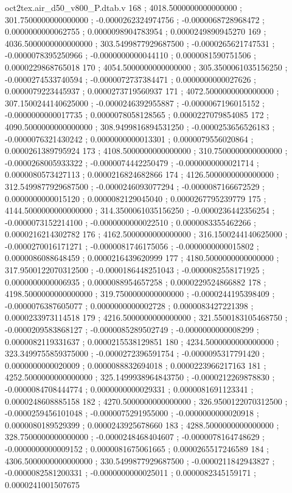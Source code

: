 \begin{filecontents}[overwrite]{oct2tex.air_d50_v800_P.dtab.v}
168 ; 4018.5000000000000000 ; 301.7500000000000000 ; -0.0000262324974756 ; -0.0000068728968472 ; 0.0000000000062755 ; 0.0000098904783954 ; 0.0000249890945270
169 ; 4036.5000000000000000 ; 303.5499877929687500 ; -0.0000265621747531 ; -0.0000078395250966 ; -0.0000000000044110 ; 0.0000081590751506 ; 0.0000229868765018
170 ; 4054.5000000000000000 ; 305.3500061035156250 ; -0.0000274533740594 ; -0.0000072737384471 ; 0.0000000000027626 ; 0.0000079223445937 ; 0.0000273719560937
171 ; 4072.5000000000000000 ; 307.1500244140625000 ; -0.0000246392955887 ; -0.0000067196015152 ; -0.0000000000017735 ; 0.0000078058128565 ; 0.0000227079854085
172 ; 4090.5000000000000000 ; 308.9499816894531250 ; -0.0000253656526183 ; -0.0000076321430242 ; 0.0000000000013301 ; 0.0000079556020864 ; 0.0000261389795924
173 ; 4108.5000000000000000 ; 310.7500000000000000 ; -0.0000268005933322 ; -0.0000074442250479 ; -0.0000000000021714 ; 0.0000080573427113 ; 0.0000216824682866
174 ; 4126.5000000000000000 ; 312.5499877929687500 ; -0.0000246093077294 ; -0.0000087166672529 ; 0.0000000000015120 ; 0.0000082129045040 ; 0.0000267795239779
175 ; 4144.5000000000000000 ; 314.3500061035156250 ; -0.0000236442356254 ; -0.0000073152214100 ; -0.0000000000022510 ; 0.0000083355462266 ; 0.0000216214302782
176 ; 4162.5000000000000000 ; 316.1500244140625000 ; -0.0000270016171271 ; -0.0000081746175056 ; -0.0000000000015802 ; 0.0000086088648459 ; 0.0000216439620999
177 ; 4180.5000000000000000 ; 317.9500122070312500 ; -0.0000186448251043 ; -0.0000082558171925 ; 0.0000000000006935 ; 0.0000088954657258 ; 0.0000229524866882
178 ; 4198.5000000000000000 ; 319.7500000000000000 ; -0.0000244195398409 ; -0.0000076387605077 ; 0.0000000000002728 ; 0.0000083427221398 ; 0.0000233973114518
179 ; 4216.5000000000000000 ; 321.5500183105468750 ; -0.0000209583868127 ; -0.0000085289502749 ; -0.0000000000008299 ; 0.0000082119331637 ; 0.0000215538129851
180 ; 4234.5000000000000000 ; 323.3499755859375000 ; -0.0000272396591754 ; -0.0000095317791420 ; 0.0000000000020009 ; 0.0000088832694018 ; 0.0000223966217163
181 ; 4252.5000000000000000 ; 325.1499938964843750 ; -0.0000212269878830 ; -0.0000084708444774 ; 0.0000000000029331 ; 0.0000081691123341 ; 0.0000248608885158
182 ; 4270.5000000000000000 ; 326.9500122070312500 ; -0.0000259456101048 ; -0.0000075291955000 ; -0.0000000000020918 ; 0.0000080189529399 ; 0.0000243925678660
183 ; 4288.5000000000000000 ; 328.7500000000000000 ; -0.0000248468404607 ; -0.0000078164748629 ; -0.0000000000009152 ; 0.0000081675061665 ; 0.0000265517246589
184 ; 4306.5000000000000000 ; 330.5499877929687500 ; -0.0000211842943827 ; -0.0000082581200331 ; -0.0000000000025011 ; 0.0000082345159171 ; 0.0000241001507675

\end{filecontents}
